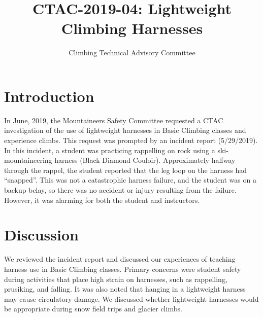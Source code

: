 \documentclass[nonacm,acmtog]{acmart}
\title{CTAC-2019-04: Lightweight Climbing Harnesses}
\subtitle{Climbing Technical Advisory Committee}
\begin{document}
\maketitle


\section{Introduction}
\label{sec:intro}
  
  In June, 2019, the Mountaineers Safety Committee requested a CTAC
  investigation of the use of lightweight harnesses in Basic Climbing classes
  and experience climbs. This request was prompted by an incident report
  (5/29/2019). In this incident, a student was practicing rappelling on rock
  using a ski-mountaineering harness (Black Diamond Couloir). Approximately
  halfway through the rappel, the student reported that the leg loop on the
  harness had ``snapped''. This was not a catastrophic harness failure, and the
  student was on a backup belay, so there was no accident or injury resulting
  from the failure. However, it was alarming for both the student and
  instructors.


\section{Discussion}
\label{sec:discuss}
  
  We reviewed the incident report and discussed our experiences of teaching
  harness use in Basic Climbing classes. Primary concerns were student safety
  during activities that place high strain on harnesses, such as rappelling,
  prusiking, and falling. It was also noted that hanging in a lightweight
  harness may cause circulatory damage. We discussed whether lightweight
  harnesses would be appropriate during snow field trips and glacier climbs.

\end{document}
